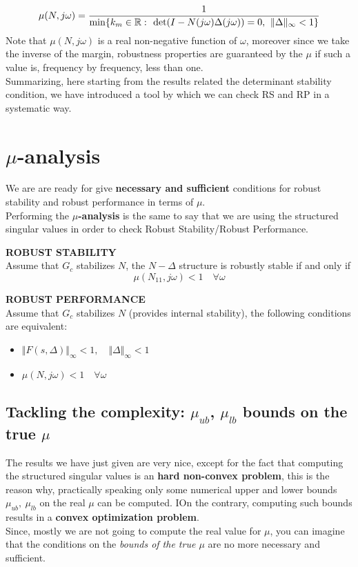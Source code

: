 \documentclass[a4paper, 12pt]{article}
\begin{document}
\begin{equation}
    \large
    \mu(N,j\omega)=\frac{1}{\min\{k_m\in\mathbb{R}: \ \det(I-N(j\omega)\Delta(j\omega))=0, \ \Vert \Delta \Vert_\infty < 1\}}
\end{equation}
Note that $\mu(N,j\omega)$ is a real non-negative function of $\omega$, moreover since we take the inverse of the margin, robustness properties are guaranteed by the $\mu$ if such a value is, frequency by frequency, less than one.\\
Summarizing, here starting from the results related the determinant stability condition, we have introduced a tool by which we can check RS and RP in a systematic way.

\section{$\mu$-analysis}
We are are ready for give \textbf{necessary and sufficient} conditions for robust stability and robust performance in terms of $\mu$.\\
 Performing the \textbf{$\mu$-analysis} is the same to say that we are using the structured singular values in order to check Robust Stability/Robust Performance.

\begin{multicols}{2}
    \noindent\textsf{\textbf{ ROBUST STABILITY}}\\
    Assume that $G_c$ stabilizes $N$, the $N-\Delta$ structure is robustly stable if and only if
    \begin{equation}
        \mu(N_{11}, j\omega) < 1 \quad \forall \omega 
    \end{equation}
    
    \newcolumn
    \noindent
    \textsf{\textbf{ROBUST PERFORMANCE}}\\
    Assume that $G_c$ stabilizes $N$ (provides internal stability), the following conditions are equivalent: 
    \begin{itemize}
        \itemsep-0.3em
        \item $\Vert F(s,\Delta) \Vert_\infty < 1, \quad \Vert \Delta \Vert_\infty<1$
        \item $\mu(N,j\omega)<1 \quad \forall \omega$ 
    \end{itemize}
\end{multicols}

\subsection{Tackling the complexity: $\mu_{ub}$, $\mu_{lb}$ bounds on the true $\mu$}
The results we have just given are very nice, except for the fact that computing the structured singular values is an \textbf{hard non-convex problem}, this is the reason why, practically speaking only some numerical upper and lower bounds $\mu_{ub}, \ \mu_{lb}$ on the real $\mu$ can be computed. IOn the contrary, computing such bounds results in a \textbf{convex optimization problem}.\\
Since, mostly we are not going to compute the real value for $\mu$, you can imagine that the conditions on the \textit{bounds of the true $\mu$} are no more necessary and sufficient.
\end{document}
